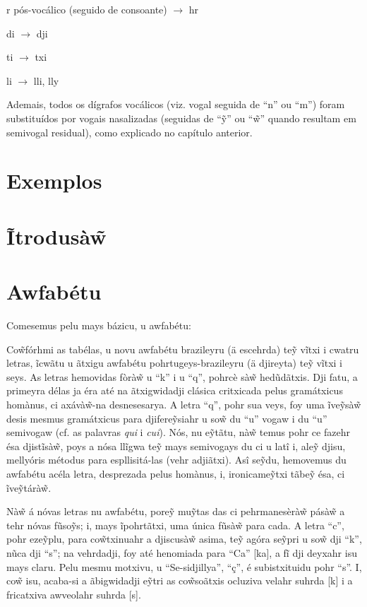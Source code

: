 \documentclass[12pt, a5paper, titlepage]{article}
\begin{document}
\begin{bilingualpages}
    r pós-vocálico (seguido de consoante) $\rightarrow$ hr

    di $\rightarrow$ dji
    
    ti $\rightarrow$ txi

    li $\rightarrow$ lli, lly

    Ademais, todos os dígrafos vocálicos (viz. vogal seguida de ``n'' ou ``m'') foram substituídos por vogais nasalizadas (seguidas de ``\~y'' ou ``\~w'' quando resultam em semivogal residual), como explicado no capítulo anterior.
    
    \section{Exemplos}
    
    \leftpage
    \section{Ĩtrodusà\~w}
    
    \newpage
    \section{Awfabétu}
    Comesemus pelu mays bázicu, u awfabétu:
    \BrTableAbc

    Co\~wfórhmi as tabélas, u novu awfabétu brazileyru (ä escehrda) te\~y vĩtxi i cwatru letras, ĩcwãtu u ãtxigu awfabétu pohrtugeys-brazileyru (ä djireyta) te\~y vĩtxi i seys. As letras hemovidas fòrà\~w u ``k'' i u ``q'', pohrcè sà\~w hedũdãtxis. Dji fatu, a primeyra délas ja éra até na ãtxigwidadji clásica critxicada pelus gramátxicus homànus, ci axávà\~w-na desnesesarya. A letra ``q'', pohr sua veys, foy uma ĩve\~ysà\~w desis mesmus gramátxicus para djifere\~ysiahr u so\~w du ``u'' vogaw i du ``u'' semivogaw (cf. as palavras \textit{qui} i \textit{cui}). Nós, nu e\~ytãtu, nà\~w temus pohr ce fazehr ésa djistĩsà\~w, poys a nósa llĩgwa te\~y mays semivogays du ci u latî i, ale\~y djisu, mellyóris métodus para espllisitá-las (vehr adjiãtxi). Asî se\~ydu, hemovemus du awfabétu acéla letra, desprezada pelus homànus, i, ironicame\~ytxi tãbe\~y ésa, ci ĩve\~ytárà\~w.

    Nà\~w á nóvas letras nu awfabétu, pore\~y mu\~ytas das ci pehrmanesèrà\~w pásà\~w a tehr nóvas fũso\~ys; i, mays ĩpohrtãtxi, uma única fũsà\~w para cada. A letra ``c'', pohr eze\~yplu, para co\~wtxinuahr a djiscusà\~w asima, te\~y agóra se\~ypri u so\~w dji ``k'', nũca dji ``s''; na vehrdadji, foy até henomiada para ``Ca'' [ka], a fĩ dji deyxahr isu mays claru. Pelu mesmu motxivu, u ``Se-sidjillya'', ``ç'', é subistxituidu pohr ``s''. I, co\~w isu, acaba-si a ãbigwidadji e\~ytri as co\~wsoãtxis ocluziva velahr suhrda [k] i a fricatxiva awveolahr suhrda [s].


\end{bilingualpages}
\end{document}
